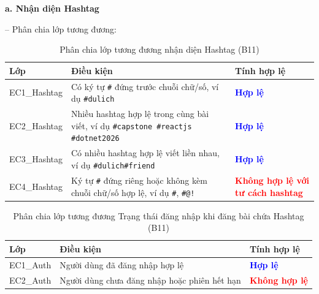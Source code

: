 \documentclass[11pt,a4paper]{article}
\begin{document}
\noindent\textbf{a. Nhận diện Hashtag}

\noindent -- Phân chia lớp tương đương:
\begin{table}[H]
\centering
\small
\begin{tabularx}{\textwidth}{|L{2.6cm}|X|L{4.2cm}|}
\hline
{}
\textbf{Lớp} & \textbf{Điều kiện} & \textbf{Tính hợp lệ} \tabularnewline
\hline
EC1\_Hashtag & Có ký tự \texttt{\#} đứng trước chuỗi chữ/số, ví dụ \texttt{\#dulich} & \textcolor{blue}{\textbf{Hợp lệ}} \\ \hline
EC2\_Hashtag & Nhiều hashtag hợp lệ trong cùng bài viết, ví dụ \texttt{\#capstone \#reactjs \#dotnet2026} & \textcolor{blue}{\textbf{Hợp lệ}} \\ \hline
EC3\_Hashtag & Có nhiều hashtag hợp lệ viết liền nhau, ví dụ \texttt{\#dulich\#friend} & \textcolor{blue}{\textbf{Hợp lệ}} \\ \hline
EC4\_Hashtag & Ký tự \texttt{\#} đứng riêng hoặc không kèm chuỗi chữ/số hợp lệ, ví dụ \texttt{\#}, \texttt{\#@!} & \textcolor{red}{\textbf{Không hợp lệ với tư cách hashtag}} \\ \hline
\end{tabularx}
\caption{Phân chia lớp tương đương nhận diện Hashtag (B11)}
\end{table}

\begin{table}[H]
\centering
\small
\begin{tabularx}{\textwidth}{|L{2.6cm}|X|L{4.2cm}|}
\hline
{}
\textbf{Lớp} & \textbf{Điều kiện} & \textbf{Tính hợp lệ} \tabularnewline
\hline
EC1\_Auth & Người dùng đã đăng nhập hợp lệ & \textcolor{blue}{\textbf{Hợp lệ}} \\ \hline
EC2\_Auth & Người dùng chưa đăng nhập hoặc phiên hết hạn & \textcolor{red}{\textbf{Không hợp lệ}} \\ \hline
\end{tabularx}
\caption{Phân chia lớp tương đương Trạng thái đăng nhập khi đăng bài chứa Hashtag (B11)}
\end{table}
\end{document}

